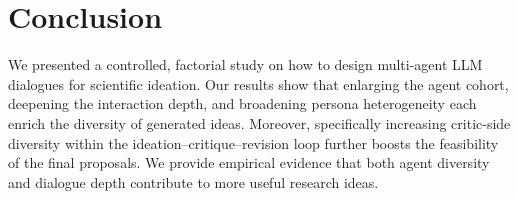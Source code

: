 \documentclass[11pt]{article}
\begin{document}
\begin{table}[t]
\centering
{}
\caption{Impact of interaction depth (number of critique--revision turns) on metrics}
\label{tab:depth}
\end{table}

\begin{table}[t]
\centering
{}
\caption{Impact of persona diversity on diversity and Precision@N}
\label{tab:diversity}
\end{table}



\section{Conclusion}

We presented a controlled, factorial study on how to design multi-agent LLM dialogues for scientific ideation. Our results show that enlarging the agent cohort, deepening the interaction depth, and broadening persona heterogeneity each enrich the diversity of generated ideas. Moreover, specifically increasing critic-side diversity within the ideation–critique–revision loop further boosts the feasibility of the final proposals. We provide empirical evidence that both agent diversity and dialogue depth contribute to more useful research ideas.
\end{document}
